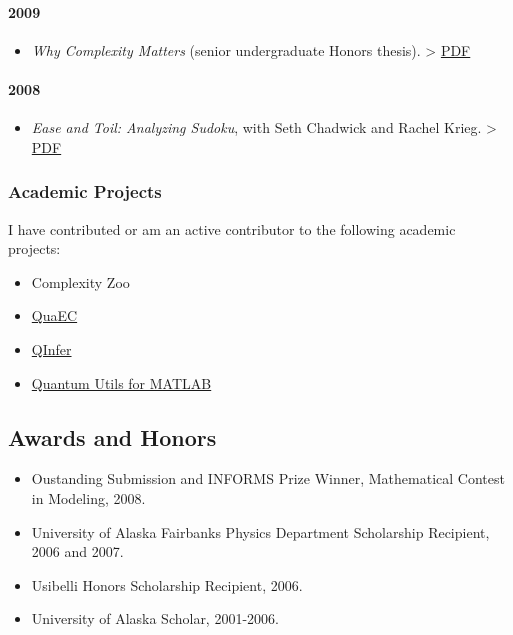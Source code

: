 \documentclass[]{article}
\begin{document}
\paragraph{2009}\label{section-4}

\begin{itemize}
\itemsep1pt\parskip0pt
\item
  \emph{Why Complexity Matters} (senior undergraduate Honors thesis).
  \textgreater{}
  \href{https://www.cgranade.com/research/papers/why-complexity-matters.pdf}{PDF}
\end{itemize}

\paragraph{2008}\label{section-5}

\begin{itemize}
\itemsep1pt\parskip0pt
\item
  \emph{Ease and Toil: Analyzing Sudoku}, with Seth Chadwick and Rachel
  Krieg. \textgreater{}
  \href{https://www.cgranade.com/research/papers/ease-and-toil.pdf}{PDF}
\end{itemize}

\subsubsection{Academic Projects}\label{academic-projects}

I have contributed or am an active contributor to the following academic
projects:

\begin{itemize}
\itemsep1pt\parskip0pt
\item
  Complexity Zoo
\item
  \href{http://github.com/cgranade/python-quaec}{QuaEC}
\item
  \href{http://github.com/csferrie/python-qinfer}{QInfer}
\item
  \href{https://github.com/CoryGroup/quantum-utils-matlab}{Quantum Utils
  for MATLAB}
\end{itemize}

\subsection{Awards and Honors}\label{awards-and-honors}

\begin{itemize}
\itemsep1pt\parskip0pt
\item
  Oustanding Submission and INFORMS Prize Winner, Mathematical Contest
  in Modeling, 2008.
\item
  University of Alaska Fairbanks Physics Department Scholarship
  Recipient, 2006 and 2007.
\item
  Usibelli Honors Scholarship Recipient, 2006.
\item
  University of Alaska Scholar, 2001-2006.
\end{itemize}
\end{document}
